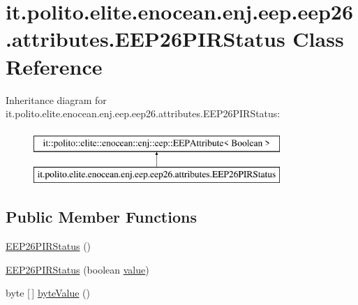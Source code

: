 \hypertarget{classit_1_1polito_1_1elite_1_1enocean_1_1enj_1_1eep_1_1eep26_1_1attributes_1_1_e_e_p26_p_i_r_status}{}\section{it.\+polito.\+elite.\+enocean.\+enj.\+eep.\+eep26.\+attributes.\+E\+E\+P26\+P\+I\+R\+Status Class Reference}
\label{classit_1_1polito_1_1elite_1_1enocean_1_1enj_1_1eep_1_1eep26_1_1attributes_1_1_e_e_p26_p_i_r_status}
Inheritance diagram for it.\+polito.\+elite.\+enocean.\+enj.\+eep.\+eep26.\+attributes.\+E\+E\+P26\+P\+I\+R\+Status\+:\begin{figure}[H]
\begin{center}
\leavevmode
\includegraphics[height=2.000000cm]{classit_1_1polito_1_1elite_1_1enocean_1_1enj_1_1eep_1_1eep26_1_1attributes_1_1_e_e_p26_p_i_r_status}
\end{center}
\end{figure}
\subsection*{Public Member Functions}
\begin{DoxyCompactItemize}
\item 
\hyperlink{classit_1_1polito_1_1elite_1_1enocean_1_1enj_1_1eep_1_1eep26_1_1attributes_1_1_e_e_p26_p_i_r_status_af43fdb1552684378ba338e0448344782}{E\+E\+P26\+P\+I\+R\+Status} ()
\item 
\hyperlink{classit_1_1polito_1_1elite_1_1enocean_1_1enj_1_1eep_1_1eep26_1_1attributes_1_1_e_e_p26_p_i_r_status_a212a736db1847ef9fa737baa19d8125e}{E\+E\+P26\+P\+I\+R\+Status} (boolean \hyperlink{classit_1_1polito_1_1elite_1_1enocean_1_1enj_1_1eep_1_1_e_e_p_attribute_af4d7e34642004bb6ccfae51e925c983d}{value})
\item 
byte \mbox{[}$\,$\mbox{]} \hyperlink{classit_1_1polito_1_1elite_1_1enocean_1_1enj_1_1eep_1_1eep26_1_1attributes_1_1_e_e_p26_p_i_r_status_af8a0f6217d96364887f9d899cdb5a072}{byte\+Value} ()
\end{DoxyCompactItemize}
